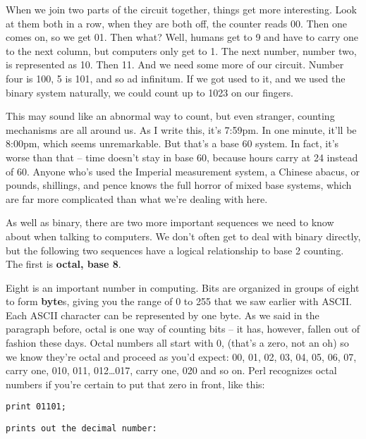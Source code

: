 \documentclass[a4paper,11pt]{book}
\begin{document}
\noindent 

\noindent When we join two parts of the circuit together, things get more interesting. Look at them both in a row, when they are both off, the counter reads 00. Then one comes on, so we get 01. Then what? Well, humans get to 9 and have to carry one to the next column, but computers only get to 1. The next number, number two, is represented as 10. Then 11. And we need some more of our circuit. Number four is 100, 5 is 101, and so ad infinitum. If we got used to it, and we used the binary system naturally, we could count up to 1023 on our fingers.

\noindent 

\noindent This may sound like an abnormal way to count, but even stranger, counting mechanisms are all around us. As I write this, it's 7:59pm. In one minute, it'll be 8:00pm, which seems unremarkable. But that's a base 60 system. In fact, it's worse than that -- time doesn't stay in base 60, because hours carry at 24 instead of 60. Anyone who's used the Imperial measurement system, a Chinese abacus, or pounds, shillings, and pence knows the full horror of mixed base systems, which are far more complicated than what we're dealing with here.

\noindent 

\noindent As well as binary, there are two more important sequences we need to know about when talking to computers. We don't often get to deal with binary directly, but the following two sequences have a logical relationship to base 2 counting. The first is \textbf{octal, base 8}.

\noindent 

\noindent Eight is an important number in computing. Bits are organized in groups of eight to form \textbf{byte}s, giving you the range of 0 to 255 that we saw earlier with ASCII. Each ASCII character can be represented by one byte. As we said in the paragraph before, octal is one way of counting bits -- it has, however, fallen out of fashion these days. Octal numbers all start with 0, (that's a zero, not an oh) so we know they're octal and proceed as you'd expect: 00, 01, 02, 03, 04, 05, 06, 07, carry one, 010, 011, 012\dots 017, carry one, 020 and so on. Perl recognizes octal numbers if you're certain to put that zero in front, like this:

\noindent 

\noindent \texttt{print 01101;}

\noindent 

\noindent \texttt{prints out the decimal number:}
\end{document}
